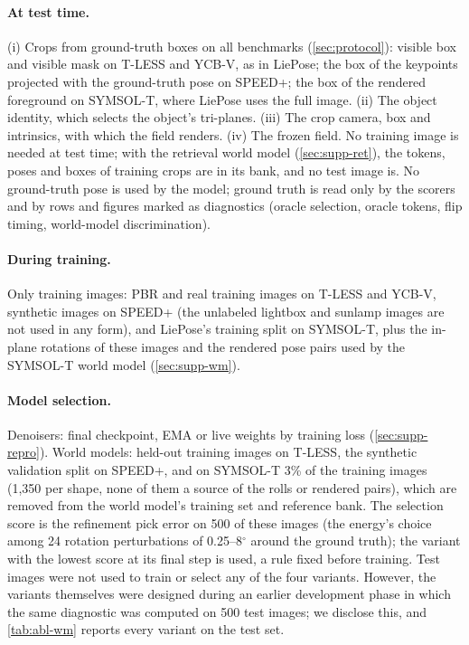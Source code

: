 \paragraph{At test time.}
(i) Crops from ground-truth boxes on all benchmarks (\cref{sec:protocol}): visible box and visible mask on T-LESS and YCB-V, as in
LiePose; the box of the keypoints projected with the ground-truth pose on SPEED+; the box of the rendered foreground on SYMSOL-T, where
LiePose uses the full image. (ii) The object identity, which selects the object's tri-planes. (iii) The crop camera, box and intrinsics, with which the field
renders. (iv) The frozen field. No training image is needed at test time; with the retrieval world model (\cref{sec:supp-ret}), the
tokens, poses and boxes of training crops are in its bank, and no test image is. No ground-truth pose is used by the model; ground truth is read only by the scorers and by rows and figures marked as diagnostics (oracle selection, oracle tokens, flip
timing, world-model discrimination).

\paragraph{During training.}
Only training images: PBR and real training images on T-LESS and YCB-V, synthetic images on SPEED+ (the unlabeled lightbox and sunlamp
images are not used in any form), and LiePose's training split on SYMSOL-T, plus the in-plane rotations of these images and the rendered
pose pairs used by the SYMSOL-T world model (\cref{sec:supp-wm}).

\paragraph{Model selection.}
Denoisers: final checkpoint, EMA or live weights by training loss (\cref{sec:supp-repro}). World models: held-out training images on
T-LESS, the synthetic validation split on SPEED+, and on SYMSOL-T 3\% of the training images (1,350 per shape, none of them a source
of the rolls or rendered pairs), which are removed from the world model's training set and reference bank. The selection score is the
refinement pick error on 500 of these images (the energy's choice among 24 rotation perturbations of 0.25--8$^\circ$ around the
ground truth); the variant with the lowest score at its final step is used, a rule fixed before training. Test images were not used to
train or select any of the four variants. However, the variants themselves were designed during an earlier development phase in which
the same diagnostic was computed on 500 test images; we disclose this, and \cref{tab:abl-wm} reports every variant on the test set.

